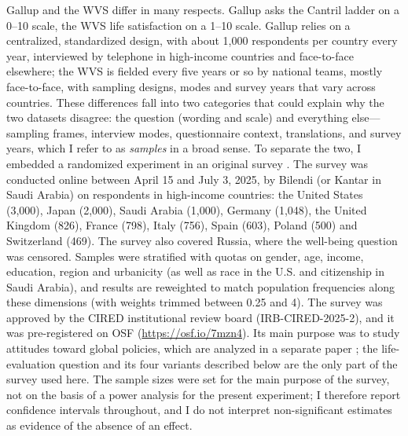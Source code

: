 \documentclass[12pt]{article}
\begin{document}
Gallup and the WVS differ in many respects. Gallup asks the Cantril ladder on a 0--10 scale, the WVS life satisfaction on a 1--10 scale. Gallup relies on a centralized, standardized design, with about 1,000 respondents per country every year, interviewed by telephone in high-income countries and face-to-face elsewhere; the WVS is fielded every five years or so by national teams, mostly face-to-face, with sampling designs, modes and survey years that vary across countries. These differences fall into two categories that could explain why the two datasets disagree: the question (wording and scale) and everything else---sampling frames, interview modes, questionnaire context, translations, and survey years, which I refer to as \textit{samples} in a broad sense. To separate the two, I embedded a randomized experiment in an original survey \citeownsurvey. The survey was conducted online between April 15 and July 3, 2025, by Bilendi (or Kantar in Saudi Arabia) on \nFabre respondents in \nFabreCountries high-income countries: the United States (3,000), Japan (2,000), Saudi Arabia (1,000), Germany (1,048), the United Kingdom (826), France (798), Italy (756), Spain (603), Poland (500) and Switzerland (469). The survey also covered Russia, where the well-being question was censored. Samples were stratified with quotas on gender, age, income, education, region and urbanicity (as well as race in the U.S. and citizenship in Saudi Arabia), and results are reweighted to match population frequencies along these dimensions (with weights trimmed between 0.25 and 4). The survey was approved by the CIRED institutional review board (IRB-CIRED-2025-2), and it was pre-registered on OSF (\href{https://osf.io/7mzn4}{https://osf.io/7mzn4}). Its main purpose was to study attitudes toward global policies, which are analyzed in a separate paper \citeownsurvey; the life-evaluation question and its four variants described below are the only part of the survey used here. The sample sizes were set for the main purpose of the survey, not on the basis of a power analysis for the present experiment; I therefore report confidence intervals throughout, and I do not interpret non-significant estimates as evidence of the absence of an effect.
\end{document}
